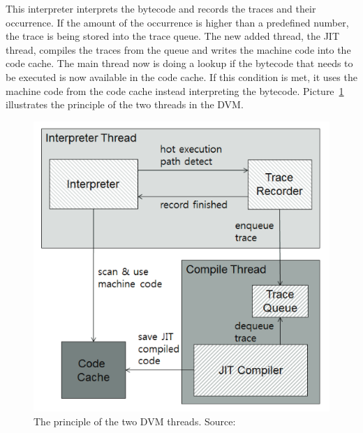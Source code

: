 This interpreter interprets the bytecode and records the traces and their occurrence.
If the amount of the occurrence is higher than a predefined number, the trace is being stored into the trace queue.
The new added thread, the JIT thread, compiles the traces from the queue and writes the machine code into the code cache.
The main thread now is doing a lookup if the bytecode that needs to be executed is now available in the code cache.
If this condition is met, it uses the machine code from the code cache instead interpreting the bytecode.\cite{oh2012evaluation}
Picture~\ref{fig:dvm-threads} illustrates the principle of the two threads in the DVM.\\
\begin{figure}[h]
\begin{center}
\includegraphics[scale=0.5]{images/dvm-threads.png} 
\caption{The principle of the two DVM threads. Source:\cite{oh2012evaluation}}
\label{fig:dvm-threads}
\end{center}
\end{figure}

